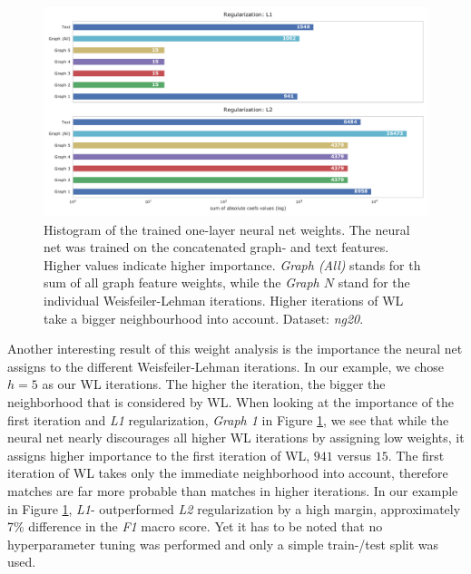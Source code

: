\begin{figure}[htb!]
	\centering
	{\includegraphics[width=\linewidth]{assets/figures/combined_coefs_l1_l2_regularization.pdf}%
		\caption{%
			Histogram of the trained one-layer neural net weights. The neural net was trained on the concatenated graph- and text features.
			Higher values indicate higher importance.
			\textit{Graph (All)} stands for th sum of all graph feature weights, while the \textit{Graph $N$} stand for the individual Weisfeiler-Lehman iterations.
			Higher iterations of WL take a bigger neighbourhood into account.
			Dataset: \textit{ng20}.
		}%
		\label{fig:combined_coefs_l1_l2_regularization}}
\end{figure}

Another interesting result of this weight analysis is the importance the neural net assigns to the different Weisfeiler-Lehman iterations. In our example, we chose $h = 5$ as our WL iterations. The higher the iteration, the bigger the neighborhood that is considered by WL.
When looking at the importance of the first iteration and \textit{L1} regularization, \textit{Graph 1} in Figure \ref{fig:combined_coefs_l1_l2_regularization}, we see that while the neural net nearly discourages all higher WL iterations by assigning low weights, it assigns higher importance to the first iteration of WL, $941$ versus $15$.
The first iteration of WL takes only the immediate neighborhood into account, therefore matches are far more probable than matches in higher iterations.
In our example in Figure \ref{fig:combined_coefs_l1_l2_regularization}, \textit{L1}- outperformed \textit{L2} regularization by a high margin, approximately 7\% difference in the \textit{F1} macro score.
Yet it has to be noted that no hyperparameter tuning was performed and only a simple train-/test split was used.



